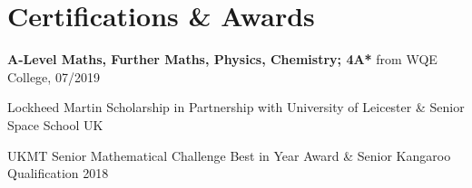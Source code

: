 \documentclass[a4paper]{article}
\begin{document}
\section{Certifications \& Awards}
\textbf{A-Level Maths, Further Maths, Physics, Chemistry; 4A*} from WQE College, 07/2019

Lockheed Martin Scholarship in Partnership with University of Leicester \& Senior Space School UK

UKMT Senior Mathematical Challenge Best in Year Award \& Senior Kangaroo Qualification 2018

\thispagestyle{empty}
\end{document}
